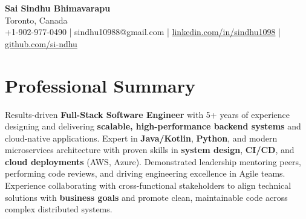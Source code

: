 \documentclass[letterpaper,11pt]{article}
\begin{document}
\begin{center}
  {\Large \textbf{Sai Sindhu Bhimavarapu}} \\
  Toronto, Canada \\
  +1-902-977-0490 \enspace | \enspace sindhu10988@gmail.com \enspace | \enspace \href{https://www.linkedin.com/in/sindhu1098/}{linkedin.com/in/sindhu1098} \enspace | \enspace \href{https://github.com/si-ndhu}{github.com/si-ndhu}
\end{center}

\section{Professional Summary}
  \begin{itemize}[leftmargin=0.15in, label={}]
    \small{\item{
     Results-driven \textbf{Full-Stack Software Engineer} with 5+ years of experience designing and delivering \textbf{scalable, high-performance backend systems} and cloud-native applications. Expert in \textbf{Java/Kotlin}, \textbf{Python}, and modern microservices architecture with proven skills in \textbf{system design}, \textbf{CI/CD}, and \textbf{cloud deployments} (AWS, Azure). Demonstrated leadership mentoring peers, performing code reviews, and driving engineering excellence in Agile teams. Experience collaborating with cross-functional stakeholders to align technical solutions with \textbf{business goals} and promote clean, maintainable code across complex distributed systems.
    }}
  \end{itemize}
\vspace{-16pt}

\end{document}
